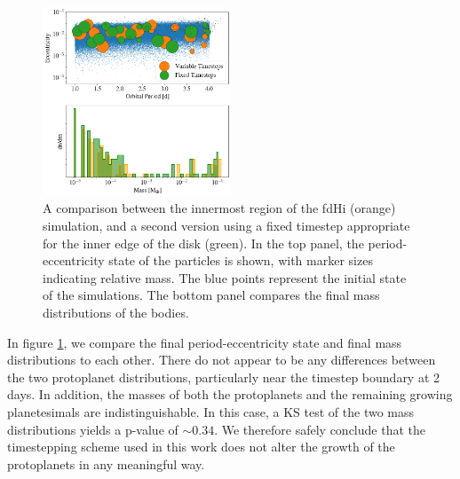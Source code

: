 \begin{figure}
\begin{center}
    \includegraphics[width=0.5\textwidth]{figures/plStip/rung_ecc.png}
    \caption{A comparison between the innermost region of the fdHi (orange) simulation, and a second version using a fixed timestep appropriate for the inner edge of the disk (green). In the top panel, the period-eccentricity state of the particles is shown, with marker sizes indicating relative mass. The blue points represent the initial state of the simulations. The bottom panel compares the final mass distributions of the bodies.\label{fig:rung_ecc}}
\end{center}
\end{figure}

In figure \ref{fig:rung_ecc}, we compare the final period-eccentricity state and final mass distributions to each other. There do not appear to be any differences between the two protoplanet distributions, particularly near the timestep boundary at 2 days. In addition, the masses of both the protoplanets and the remaining growing planetesimals are indistinguishable. In this case, a KS test of the two mass distributions yields a p-value of $\sim 0.34$. We therefore safely conclude that the timestepping scheme used in this work does not alter the growth of the protoplanets in any meaningful way.